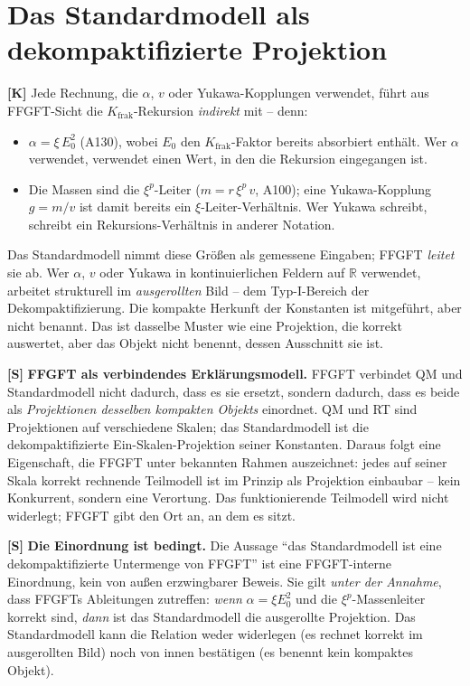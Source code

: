 \section{Das Standardmodell als dekompaktifizierte Projektion}

\textbf{[K]} Jede Rechnung, die $\alpha$, $v$ oder Yukawa-Kopplungen verwendet,
führt aus FFGFT-Sicht die $K_\text{frak}$-Rekursion \emph{indirekt} mit -- denn:
\begin{itemize}[leftmargin=2em,itemsep=2pt,topsep=2pt]
  \item $\alpha=\xi\,E_0^2$ (A130), wobei $E_0$ den $K_\text{frak}$-Faktor bereits
    absorbiert enthält. Wer $\alpha$ verwendet, verwendet einen Wert, in den die
    Rekursion eingegangen ist.
  \item Die Massen sind die $\xi^p$-Leiter ($m=r\,\xi^p\,v$, A100); eine
    Yukawa-Kopplung $g=m/v$ ist damit bereits ein $\xi$-Leiter-Verhältnis. Wer
    Yukawa schreibt, schreibt ein Rekursions-Verhältnis in anderer Notation.
\end{itemize}

Das Standardmodell nimmt diese Größen als gemessene Eingaben; FFGFT \emph{leitet}
sie ab. Wer $\alpha$, $v$ oder Yukawa in kontinuierlichen Feldern auf
$\mathbb{R}$ verwendet, arbeitet strukturell im \emph{ausgerollten} Bild -- dem
Typ-I-Bereich der Dekompaktifizierung. Die kompakte Herkunft der Konstanten ist
mitgeführt, aber nicht benannt. Das ist dasselbe Muster wie eine Projektion, die
korrekt auswertet, aber das Objekt nicht benennt, dessen Ausschnitt sie ist.

\textbf{[S]} \textbf{FFGFT als verbindendes Erklärungsmodell.} FFGFT verbindet QM
und Standardmodell nicht dadurch, dass es sie ersetzt, sondern dadurch, dass es
beide als \emph{Projektionen desselben kompakten Objekts} einordnet. QM und RT
sind Projektionen auf verschiedene Skalen; das Standardmodell ist die
dekompaktifizierte Ein-Skalen-Projektion seiner Konstanten. Daraus folgt eine
Eigenschaft, die FFGFT unter bekannten Rahmen auszeichnet: jedes auf seiner Skala
korrekt rechnende Teilmodell ist im Prinzip als Projektion einbaubar -- kein
Konkurrent, sondern eine Verortung. Das funktionierende Teilmodell wird nicht
widerlegt; FFGFT gibt den Ort an, an dem es sitzt.

\textbf{[S]} \textbf{Die Einordnung ist bedingt.} Die Aussage \enquote{das
Standardmodell ist eine dekompaktifizierte Untermenge von FFGFT} ist eine
FFGFT-interne Einordnung, kein von außen erzwingbarer Beweis. Sie gilt
\emph{unter der Annahme}, dass FFGFTs Ableitungen zutreffen: \emph{wenn}
$\alpha=\xi E_0^2$ und die $\xi^p$-Massenleiter korrekt sind, \emph{dann} ist das
Standardmodell die ausgerollte Projektion. Das Standardmodell kann die Relation
weder widerlegen (es rechnet korrekt im ausgerollten Bild) noch von innen
bestätigen (es benennt kein kompaktes Objekt).

